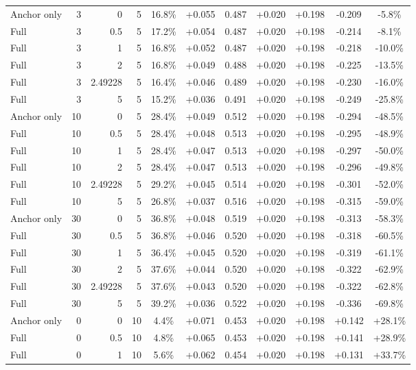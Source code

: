\begin{table}[htbp]
\begin{tabular}{lrrrccccccc}
Anchor only & 3 & 0 & 5 & 16.8\% & +0.055 & 0.487 & +0.020 & +0.198 & -0.209 & -5.8\% \\
Full & 3 & 0.5 & 5 & 17.2\% & +0.054 & 0.487 & +0.020 & +0.198 & -0.214 & -8.1\% \\
Full & 3 & 1 & 5 & 16.8\% & +0.052 & 0.487 & +0.020 & +0.198 & -0.218 & -10.0\% \\
Full & 3 & 2 & 5 & 16.8\% & +0.049 & 0.488 & +0.020 & +0.198 & -0.225 & -13.5\% \\
Full & 3 & 2.49228 & 5 & 16.4\% & +0.046 & 0.489 & +0.020 & +0.198 & -0.230 & -16.0\% \\
Full & 3 & 5 & 5 & 15.2\% & +0.036 & 0.491 & +0.020 & +0.198 & -0.249 & -25.8\% \\
Anchor only & 10 & 0 & 5 & 28.4\% & +0.049 & 0.512 & +0.020 & +0.198 & -0.294 & -48.5\% \\
Full & 10 & 0.5 & 5 & 28.4\% & +0.048 & 0.513 & +0.020 & +0.198 & -0.295 & -48.9\% \\
Full & 10 & 1 & 5 & 28.4\% & +0.047 & 0.513 & +0.020 & +0.198 & -0.297 & -50.0\% \\
Full & 10 & 2 & 5 & 28.4\% & +0.047 & 0.513 & +0.020 & +0.198 & -0.296 & -49.8\% \\
Full & 10 & 2.49228 & 5 & 29.2\% & +0.045 & 0.514 & +0.020 & +0.198 & -0.301 & -52.0\% \\
Full & 10 & 5 & 5 & 26.8\% & +0.037 & 0.516 & +0.020 & +0.198 & -0.315 & -59.0\% \\
Anchor only & 30 & 0 & 5 & 36.8\% & +0.048 & 0.519 & +0.020 & +0.198 & -0.313 & -58.3\% \\
Full & 30 & 0.5 & 5 & 36.8\% & +0.046 & 0.520 & +0.020 & +0.198 & -0.318 & -60.5\% \\
Full & 30 & 1 & 5 & 36.4\% & +0.045 & 0.520 & +0.020 & +0.198 & -0.319 & -61.1\% \\
Full & 30 & 2 & 5 & 37.6\% & +0.044 & 0.520 & +0.020 & +0.198 & -0.322 & -62.9\% \\
Full & 30 & 2.49228 & 5 & 37.6\% & +0.043 & 0.520 & +0.020 & +0.198 & -0.322 & -62.8\% \\
Full & 30 & 5 & 5 & 39.2\% & +0.036 & 0.522 & +0.020 & +0.198 & -0.336 & -69.8\% \\
Anchor only & 0 & 0 & 10 & 4.4\% & +0.071 & 0.453 & +0.020 & +0.198 & +0.142 & +28.1\% \\
Full & 0 & 0.5 & 10 & 4.8\% & +0.065 & 0.453 & +0.020 & +0.198 & +0.141 & +28.9\% \\
Full & 0 & 1 & 10 & 5.6\% & +0.062 & 0.454 & +0.020 & +0.198 & +0.131 & +33.7\% \\

\end{tabular}
\end{table}
